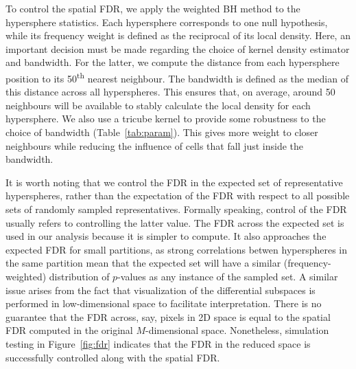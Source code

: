 \documentclass{article}
\begin{document}
To control the spatial FDR, we apply the weighted BH method to the hypersphere statistics.
Each hypersphere corresponds to one null hypothesis, while its frequency weight is defined as the reciprocal of its local density.
Here, an important decision must be made regarding the choice of kernel density estimator and bandwidth.
For the latter, we compute the distance from each hypersphere position to its 50\textsuperscript{th} nearest neighbour.
The bandwidth is defined as the median of this distance across all hyperspheres.
This ensures that, on average, around 50 neighbours will be available to stably calculate the local density for each hypersphere.
We also use a tricube kernel to provide some robustness to the choice of bandwidth (Table~\ref{tab:param}).
This gives more weight to closer neighbours while reducing the influence of cells that fall just inside the bandwidth.

It is worth noting that we control the FDR in the expected set of representative hyperspheres, rather than the expectation of the FDR with respect to all possible sets of randomly sampled representatives.
Formally speaking, control of the FDR usually refers to controlling the latter value.
The FDR across the expected set is used in our analysis because it is simpler to compute.
It also approaches the expected FDR for small partitions, as strong correlations betwen hyperspheres in the same partition mean that the expected set will have a similar (frequency-weighted) distribution of $p$-values as any instance of the sampled set.
A similar issue arises from the fact that visualization of the differential subspaces is performed in low-dimensional space to facilitate interpretation.
There is no guarantee that the FDR across, say, pixels in 2D space is equal to the spatial FDR computed in the original $M$-dimensional space.
Nonetheless, simulation testing in Figure~\ref{fig:fdr} indicates that the FDR in the reduced space is successfully controlled along with the spatial FDR.

\newcommand{\hi}{\textsuperscript{high}}
\newcommand{\lo}{\textsuperscript{low}}
\end{document}
